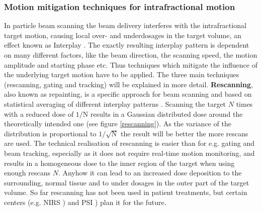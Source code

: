 \newpage

\subsubsection{Motion mitigation techniques for intrafractional motion}

In particle beam scanning the beam delivery interferes with the intrafractional target 
motion, causing local over- and underdosages in the target volume, an effect known as Interplay \cite{Phi92, Ber08, Ber12, Loe13}. 
The exactly resulting interplay pattern is dependent on many different factors, like the beam direction, the scanning speed, the motion 
amplitude and starting phase etc. Thus techniques which mitigate the influence of the underlying target motion have to be applied. The three 
main techniques (rescanning, gating and tracking) will be explained in more detail.\newline
\newline
\textbf{Rescanning}, also known as repainting, is a specific approach for beam scanning and based on statistical averaging of different 
interplay patterns \cite{Phi92, Rie10}. Scanning the target $N$ times with a reduced dose of $\mathrm{1}/\mathrm{N}$ results in a 
Gaussian distributed dose around the theoretically intended one (see figure \ref{rescanning}). As the variance of the distribution is proportional 
to $\mathrm{1}/\mathrm{\sqrt{N}}$ the result will be better the more rescans are used. The technical realisation of rescanning is easier than 
for e.g. gating and beam tracking, 
especially as it does not require real-time motion monitoring, and results in a homogeneous dose to the inner region of the target when 
using enough rescans $N$. Anyhow it can lead to an increased dose deposition to the surrounding, normal tissue and to under dosages in 
the outer part of the target volume. So far rescanning has not been used in patient treatments, but certain centers (e.g. NIRS \cite{Fur07}) 
and PSI \cite{Zen10}) plan it for the future.

\vspace*{-0.4cm}

